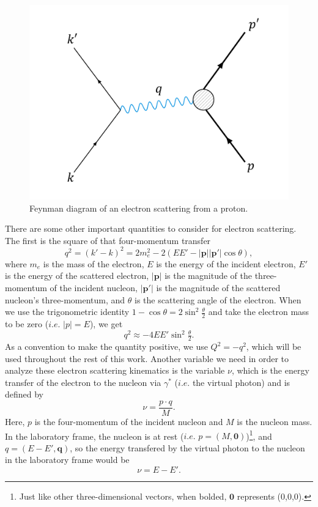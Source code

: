 \begin{figure}[h!]
	\centering
	\includegraphics[width=0.6\linewidth]{figures/feyn_epscatt.png}
	\caption{Feynman diagram of an electron scattering from a proton.}
	\label{fig:feyn_epscatt}
\end{figure}

There are some other important quantities to consider for electron scattering. The first is the square of that four-momentum transfer
\begin{equation}
q^2 = (k' - k)^2 = 2m_e^2 - 2(EE' - |\mathbf{p}||\mathbf{p}'| \cos \theta),
\end{equation}
where $m_e$ is the mass of the electron, $E$ is the energy of the incident electron, $E'$ is the energy of the scattered electron, $|\mathbf{p}|$ is the magnitude of the three-momentum of the incident nucleon, $|\mathbf{p}'|$ is the magnitude of the scattered nucleon's three-momentum, and $\theta$ is the scattering angle of the electron. When we use the trigonometric identity $1-\cos \theta = 2 \sin^2 \tfrac{\theta}{2}$ and take the electron mass to be zero ($i.e.$ $|p| = E$), we get
\begin{equation}
q^2 \approx -4EE'\sin^2\tfrac{\theta}{2}.
\end{equation}
As a convention to make the quantity positive, we use $Q^2 = -q^2$, which will be used throughout the rest of this work. Another variable we need in order to analyze these electron scattering kinematics is the variable $\nu$, which is the energy transfer of the electron to the nucleon via $\gamma^*$ ($i.e.$ the virtual photon) and is defined by
\begin{equation}
\nu = \frac{p \cdot q}{M}.
\end{equation}
Here, $p$ is the four-momentum of the incident nucleon and $M$ is the nucleon mass. In the laboratory frame, the nucleon is at rest ($i.e.$ $p=(M,\mathbf{0})$)\footnote{Just like other three-dimensional vectors, when bolded, $\mathbf{0}$ represents (0,0,0).}, and $q=(E-E',\mathbf{q})$, so the energy transfered by the virtual photon to the nucleon in the laboratory frame would be
\begin{equation}
\nu  = E-E'.
\end{equation}

